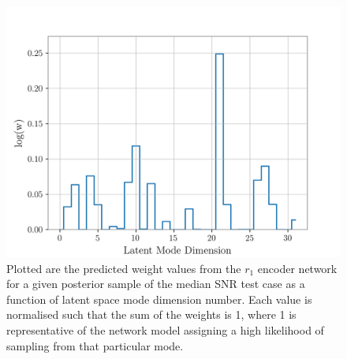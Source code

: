 

%
%
\begin{figure}
    \includegraphics[width=\columnwidth]{figures/latent_weight_pub_plot_event_241.png}
    \caption[Latent space weight plot for the median SNR test sample in 
    the \texttt{VItamin} paper training set.]{\label{fig:latent_weight_0} 
    Plotted are the predicted weight values from the $r_1$ encoder 
    network for a given posterior sample of the median \ac{SNR} test 
    case as a function of latent space mode dimension number. Each 
    value is normalised such that the sum of the weights is 1, where 1 
    is representative of the network model assigning a high 
    likelihood of sampling from that particular mode. 
    ~}
\end{figure}

